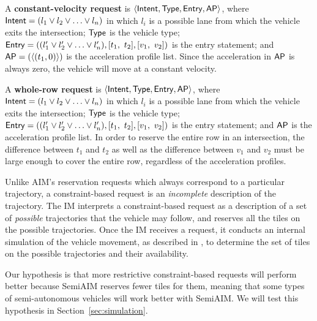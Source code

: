 \begin{small_ind_s_itemize}
\item A \textbf{constant-velocity request}
is $\langle {\sf Intent}, {\sf Type}, {\sf Entry}, {\sf AP} \rangle$,
where
${\sf Intent} = ( l_1 \vee l_2 \vee \ldots \vee l_n )$
in which $l_i$ is a possible lane from which the vehicle 
exits the intersection;
${\sf Type}$ is the vehicle type;
${\sf Entry} = (( l'_1 \vee l'_2 \vee \ldots \vee l'_n ), [t_1,\ t_2], [v_1,\ v_2])$
is the entry statement; and
${\sf AP} = ( \langle (t_1, 0) \rangle )$
is the acceleration profile list.
Since the acceleration in ${\sf AP}$
is always zero, the vehicle will move at a constant velocity.

\item A \textbf{whole-row request}
is $\langle {\sf Intent}, {\sf Type}, {\sf Entry}, {\sf AP} \rangle$,
where
${\sf Intent} = ( l_1 \vee l_2 \vee \ldots \vee l_n )$
in which $l_i$ is a possible lane from which the vehicle 
exits the intersection;
${\sf Type}$ is the vehicle type;
${\sf Entry} = (( l'_1 \vee l'_2 \vee \ldots \vee l'_n ), [t_1,\ t_2], [v_1,\ v_2])$
is the entry statement; and
${\sf AP}$ is the acceleration profile list.
In order to reserve the entire row in an intersection,
the difference between $t_1$ and $t_2$ 
as well as the difference between $v_1$ and $v_2$
must be large enough to cover the entire row,
regardless of the acceleration profiles.
\end{small_ind_s_itemize}

\noindent
Unlike AIM's reservation requests which always correspond to a
particular trajectory, a constraint-based request is an
\emph{incomplete} description of the trajectory.  The IM
interprets a constraint-based request as a description of a set of
\emph{possible} trajectories that the vehicle may follow, and reserves
all the tiles on the possible trajectories.  Once the IM receives a
request, it conducts an internal simulation of the vehicle
movement, as described in \cite{bib:Dresner08Multiagent}, to determine
the set of tiles on the possible trajectories and their availability.

Our hypothesis is that more restrictive constraint-based requests
will perform better because SemiAIM reserves fewer tiles for them,
meaning that some types of semi-autonomous vehicles will work better
with SemiAIM.  We will test this hypothesis in
Section~\ref{sec:simulation}.



